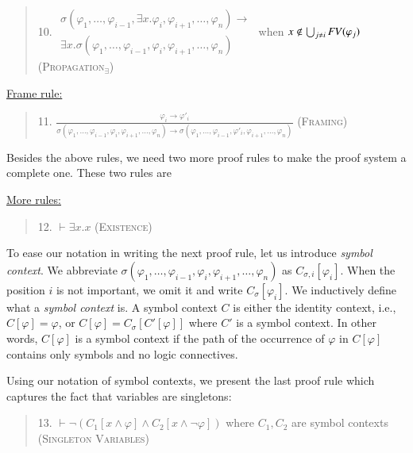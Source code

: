 \documentclass[UTF8,11pt]{article}
\theoremstyle{plain}
\theoremstyle{definition}
\theoremstyle{remark}
\newcommand{\imp}{\to}
\newcommand{\ddd}{,\dots,}
\newcommand{\CSub}[1]{C_{#1}}
\newcommand{\Csigmaapp}[1]{\CSub{\sigma}[#1]}
\newcommand{\Csigmaiapp}[1]{\CSub{\sigma,i}[#1]}
\newcommand{\FV}{{\it FV}}
\begin{document}
\begin{quote}
10.
$
\begin{array}{l}
\sigma(
\varphi_1 \ddd \varphi_{i-1},
\exists x . \varphi_i,
\varphi_{i+1} \ddd \varphi_n) \imp
\\
\exists x .
\sigma(\varphi_1 \ddd \varphi_{i-1}, \varphi_i,
\varphi_{i+1} \ddd \varphi_n)
\end{array}
$
when $x \not\in \bigcup_{j \neq i} \FV(\varphi_j)$
\hfill \textsc{(Propagation$_\exists$)}
\end{quote}

\vspace*{2ex}

\noindent
\underline{Frame rule:}

\begin{quote}
 11.
 $\displaystyle\frac{\varphi_i \imp \varphi'_i}
 {\sigma(\varphi_1 \ddd \varphi_{i-1} ,
  \varphi_i,
  \varphi_{i+1} \ddd \varphi_n)
  \imp
  \sigma(\varphi_1 \ddd \varphi_{i-1} ,
  \varphi'_i,
  \varphi_{i+1} \ddd \varphi_n)
 }$
 \hfill \textsc{(Framing)}
\end{quote}

Besides the above rules, we need two more proof rules
to make the proof system a complete one.
These two rules are

\vspace*{2ex}

\noindent
\underline{More rules:}

\begin{quote}
 12.
 $\vdash \exists x . x$
 \hfill \textsc{(Existence)}
\end{quote}

To ease our notation in writing the next proof rule,
let us introduce \emph{symbol context}.
We abbreviate
$\sigma(\varphi_1 \ddd \varphi_{i-1}, \varphi_i,
        \varphi_{i+1} \ddd \varphi_n)$
as $\Csigmaiapp{\varphi_i}$.
When the position $i$ is not important,
we omit it and write $\Csigmaapp{\varphi_i}$.
We inductively define what a \emph{symbol context} is.
A symbol context $C$ is either the identity context, i.e.,
$C[\varphi] = \varphi$,
or $C[\varphi] = \Csigmaapp{C'[\varphi]}$
where $C'$ is a symbol context.
In other words, $C[\varphi]$ is a symbol context if
the path of the occurrence of $\varphi$ in $C[\varphi]$
contains only symbols and no logic connectives.

Using our notation of symbol contexts, we present the last proof rule
which captures the fact that variables are singletons:

\begin{quote}
 13.
 $\vdash \neg ( C_1[x \wedge \varphi]
  \wedge C_2[ x \wedge \neg \varphi ] )$
 where $C_1, C_2$ are symbol contexts
 \hfill \textsc{(Singleton Variables)}
\end{quote}
\end{document}
